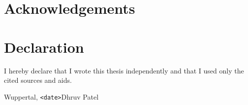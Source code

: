 \chapter*{Acknowledgements}

\chapter*{Declaration}
I hereby declare that I wrote this thesis independently and that I used only the cited sources and aids.

\vspace{2cm}
\noindent Wuppertal, \texttt{<date>}\hfill Dhruv Patel
